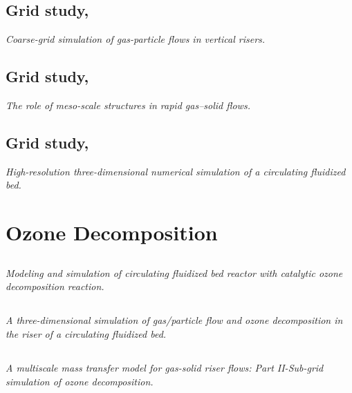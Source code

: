 \documentclass[12pt]{report}
\begin{document}
%
%
\subsection[Grid study, 2005]{Grid study, \cite{AndrewsIV2005}}
\textit{Coarse-grid simulation of gas-particle flows in vertical risers.}

%
%
\subsection[Grid study, 2001]{Grid study, \cite{Agrawal2001}}
\textit{The role of meso-scale structures in rapid gas–solid flows.}

%
%
\subsection[Grid study, 2001]{Grid study, \cite{Zhang2001}}
\textit{High-resolution three-dimensional numerical simulation of a circulating fluidized bed.}



\section{Ozone Decomposition}
%
%
\subsection[2003]{\cite{Therdthianwong2003}}
\textit{Modeling and simulation of circulating fluidized bed reactor with catalytic ozone decomposition reaction.}

%
%
\subsection[2004]{\cite{Hansen2004}}
\textit{A three-dimensional simulation of gas/particle flow and ozone decomposition in the riser of a circulating fluidized bed.}

%
%
\subsection[2008]{\cite{Dong2008}}
\textit{A multiscale mass transfer model for gas-solid riser flows: Part II-Sub-grid simulation of ozone decomposition.} 
\end{document}
